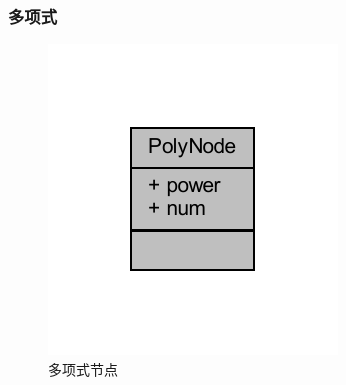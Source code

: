 

\subsubsection{多项式}
\begin{figure}[H]
    \begin{minipage}[c]{0.25\linewidth}
        \centering
        \includegraphics[width=\linewidth]{figures/struct_poly_node}
        \caption{多项式节点}
        \label{fig:structnode}
    \end{minipage}
    \begin{minipage}[c]{0.3\linewidth}
        \centering

\end{minipage}
\end{figure}
